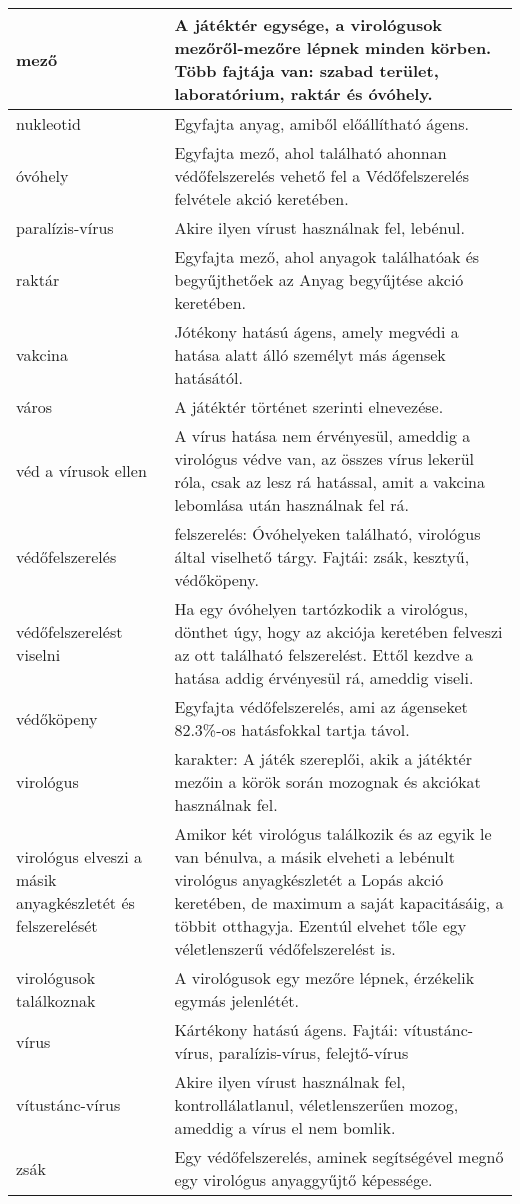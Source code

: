 \begin{xltabular}{\textwidth}{|l|X|}
	\hline
	mező & A játéktér egysége, a virológusok mezőről-mezőre lépnek minden körben. Több fajtája van: szabad terület, laboratórium, raktár és óvóhely. \\
	\hline
	nukleotid & Egyfajta anyag, amiből előállítható ágens. \\
	\hline
	óvóhely & Egyfajta mező, ahol található ahonnan védőfelszerelés vehető fel a Védőfelszerelés felvétele akció keretében. \\
	\hline
	paralízis-vírus & Akire ilyen vírust használnak fel, lebénul. \\
	\hline
	raktár & Egyfajta mező, ahol anyagok találhatóak és begyűjthetőek az Anyag begyűjtése akció keretében. \\
	\hline
	vakcina & Jótékony hatású ágens, amely megvédi a hatása alatt álló személyt más ágensek hatásától. \\
	\hline
	város & A játéktér történet szerinti elnevezése. \\
	\hline
	véd a vírusok ellen & A vírus hatása nem érvényesül, ameddig a virológus védve van, az összes vírus lekerül róla, csak az lesz rá hatással, amit a vakcina lebomlása után használnak fel rá. \\
	\hline
	védőfelszerelés & felszerelés: Óvóhelyeken található, virológus által viselhető tárgy. Fajtái: zsák, kesztyű, védőköpeny. \\
	\hline
	védőfelszerelést viselni & Ha egy óvóhelyen tartózkodik a virológus, dönthet úgy, hogy az akciója keretében felveszi az ott található felszerelést. Ettől kezdve a hatása addig érvényesül rá, ameddig viseli. \\
	\hline
	védőköpeny & Egyfajta védőfelszerelés, ami az ágenseket 82.3\%-os hatásfokkal tartja távol. \\
	\hline
	virológus & karakter: A játék szereplői, akik a játéktér mezőin a körök során mozognak és akciókat használnak fel. \\
	\hline
	virológus elveszi a másik anyagkészletét és felszerelését & Amikor két virológus találkozik és az egyik le van bénulva, a másik elveheti a lebénult virológus anyagkészletét a Lopás akció keretében, de maximum a saját kapacitásáig, a többit otthagyja. Ezentúl elvehet tőle egy véletlenszerű védőfelszerelést is.  \\
	\hline
	virológusok találkoznak & A virológusok egy mezőre lépnek, érzékelik egymás jelenlétét. \\
	\hline
	vírus & Kártékony hatású ágens. Fajtái: vítustánc-vírus, paralízis-vírus, felejtő-vírus \\
	\hline
	vítustánc-vírus & Akire ilyen vírust használnak fel, kontrollálatlanul, véletlenszerűen mozog, ameddig a vírus el nem bomlik. \\
	\hline
	zsák & Egy védőfelszerelés, aminek segítségével megnő egy virológus anyaggyűjtő képessége. \\
	\hline
\end{xltabular}
